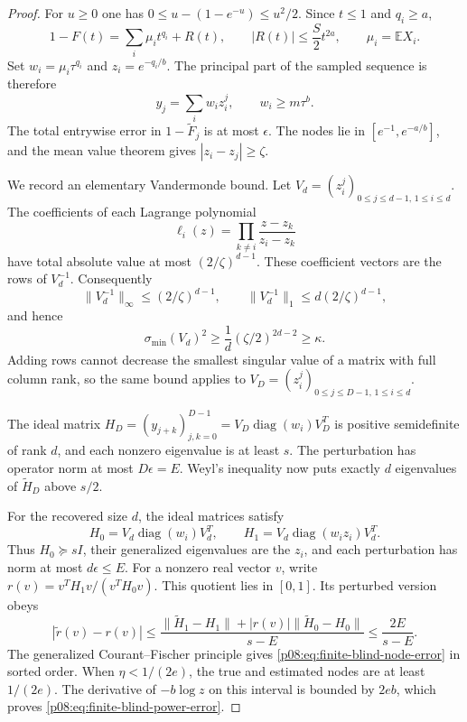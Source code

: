 \documentclass[11pt,letterpaper]{article}
\theoremstyle{definition}
\theoremstyle{remark}
\newcommand{\1}{\mathbf 1}
\begin{document}
\begin{proof}
For $u\geq0$ one has
$0\leq u-(1-e^{-u})\leq u^2/2$.  Since $t\leq1$ and $q_i\geq a$,
\begin{equation}\label{p08:eq:finite-blind-linearization}
 1-F(t)=\sum_i\mu_i t^{q_i}+R(t),\qquad
 |R(t)|\leq \frac S2t^{2a},\qquad \mu_i=\mathbb E X_i.
\end{equation}
Set $w_i=\mu_i\tau^{q_i}$ and $z_i=e^{-q_i/b}$.  The principal
part of the sampled sequence is therefore
\[
 y_j=\sum_i w_i z_i^j,\qquad w_i\geq m\tau^b.
\]
The total entrywise error in $1-\widetilde F_j$ is at most $\epsilon$.
The nodes lie in $[e^{-1},e^{-a/b}]$, and the mean value theorem gives
$|z_i-z_j|\geq\zeta$.

We record an elementary Vandermonde bound.  Let
$V_d=(z_i^j)_{0\leq j\leq d-1,\,1\leq i\leq d}$.
The coefficients of each Lagrange polynomial
\[
 \ell_i(z)=\prod_{k\ne i}\frac{z-z_k}{z_i-z_k}
\]
have total absolute value at most $(2/\zeta)^{d-1}$.
These coefficient vectors are the rows of $V_d^{-1}$.
Consequently
\[
 \|V_d^{-1}\|_\infty\leq(2/\zeta)^{d-1},\qquad
 \|V_d^{-1}\|_1\leq d(2/\zeta)^{d-1},
\]
and hence
\begin{equation}\label{p08:eq:finite-blind-vandermonde}
 \sigma_{\min}(V_d)^2\geq
 \frac1d(\zeta/2)^{2d-2}\geq\kappa.
\end{equation}
Adding rows cannot decrease the smallest singular value of a matrix
with full column rank, so the same bound applies to
$V_D=(z_i^j)_{0\leq j\leq D-1,\,1\leq i\leq d}$.

The ideal matrix
$H_D=(y_{j+k})_{j,k=0}^{D-1}=V_D\operatorname{diag}(w_i)V_D^T$
is positive semidefinite of rank $d$, and each nonzero eigenvalue is
at least $s$.  The perturbation has operator norm at most $D\epsilon=E$.
Weyl's inequality now puts exactly $d$ eigenvalues of
$\widetilde H_D$ above $s/2$.

For the recovered size $d$, the ideal matrices satisfy
\[
 H_0=V_d\operatorname{diag}(w_i)V_d^T,\qquad
 H_1=V_d\operatorname{diag}(w_i z_i)V_d^T.
\]
Thus $H_0\succeq sI$, their generalized eigenvalues are the $z_i$,
and each perturbation has norm at most $d\epsilon\leq E$.
For a nonzero real vector $v$, write
$r(v)=v^TH_1v/(v^TH_0v)$.  This quotient lies in $[0,1]$.
Its perturbed version obeys
\[
 |\widetilde r(v)-r(v)|
 \leq\frac{\|\widetilde H_1-H_1\|+
              |r(v)|\|\widetilde H_0-H_0\|}{s-E}
 \leq\frac{2E}{s-E}.
\]
The generalized Courant--Fischer principle gives
\eqref{p08:eq:finite-blind-node-error} in sorted order.  When
$\eta<1/(2e)$, the true and estimated nodes are at least $1/(2e)$.
The derivative of $-b\log z$ on this interval is bounded by $2eb$,
which proves \eqref{p08:eq:finite-blind-power-error}.
\end{proof}
\end{document}
